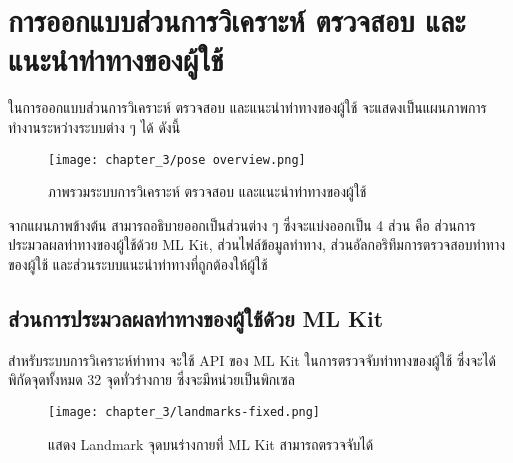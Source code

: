 \section{การออกแบบส่วนการวิเคราะห์ ตรวจสอบ และแนะนำท่าทางของผู้ใช้}
ในการออกแบบส่วนการวิเคราะห์ ตรวจสอบ และแนะนำท่าทางของผู้ใช้ จะแสดงเป็นแผนภาพการทำงานระหว่างระบบต่าง ๆ ได้ ดังนี้
\begin{figure}
    \texttt{[image: chapter\_3/pose overview.png]}
    \caption{ภาพรวมระบบการวิเคราะห์ ตรวจสอบ และแนะนำท่าทางของผู้ใช้}
\end{figure}
จากแผนภาพข้างต้น สามารถอธิบายออกเป็นส่วนต่าง ๆ ซึ่งจะแบ่งออกเป็น 4 ส่วน คือ ส่วนการประมวลผลท่าทางของผู้ใช้ด้วย ML Kit, ส่วนไฟล์ข้อมูลท่าทาง, ส่วนอัลกอริทึมการตรวจสอบท่าทางของผู้ใช้ และส่วนระบบแนะนำท่าทางที่ถูกต้องให้ผู้ใช้

\subsection{ส่วนการประมวลผลท่าทางของผู้ใช้ด้วย ML Kit}
สำหรับระบบการวิเคราะห์ท่าทาง จะใช้ API ของ ML Kit ในการตรวจจับท่าทางของผู้ใช้ ซึ่งจะได้พิกัดจุดทั้งหมด 32 จุดทั่วร่างกาย ซึ่งจะมีหน่วยเป็นพิกเซล
\begin{figure}
    \texttt{[image: chapter\_3/landmarks-fixed.png]}
    \caption{แสดง Landmark จุดบนร่างกายที่ ML Kit สามารถตรวจจับได้}
\end{figure}

